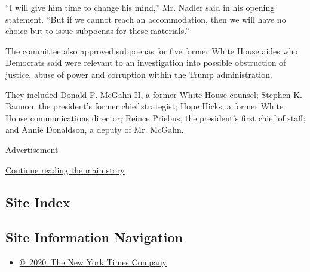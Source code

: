 ``I will give him time to change his mind,'' Mr. Nadler said in his
opening statement. ``But if we cannot reach an accommodation, then we
will have no choice but to issue subpoenas for these materials.''

The committee also approved subpoenas for five former White House aides
who Democrats said were relevant to an investigation into possible
obstruction of justice, abuse of power and corruption within the Trump
administration.

They included Donald F. McGahn II, a former White House counsel; Stephen
K. Bannon, the president's former chief strategist; Hope Hicks, a former
White House communications director; Reince Priebus, the president's
first chief of staff; and Annie Donaldson, a deputy of Mr. McGahn.

Advertisement

\protect\hyperlink{after-bottom}{Continue reading the main story}

\hypertarget{site-index}{%
\subsection{Site Index}\label{site-index}}

\hypertarget{site-information-navigation}{%
\subsection{Site Information
Navigation}\label{site-information-navigation}}

\begin{itemize}
\tightlist
\item
  \href{https://help.nytimes3xbfgragh.onion/hc/en-us/articles/115014792127-Copyright-notice}{©~2020~The
  New York Times Company}
\end{itemize}

